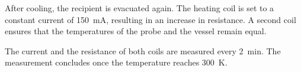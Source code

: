 After cooling, the recipient is evacuated again. 
The heating coil is set to a constant current of \SI{150}{\milli\ampere}, 
resulting in an increase in resistance.
A second coil ensures that the temperatures of the probe and 
the vessel remain equal. 

The current and the resistance of both coils are measured every \SI{2}{\minute}.
The measurement concludes once the temperature reaches \SI{300}{\kelvin}.
